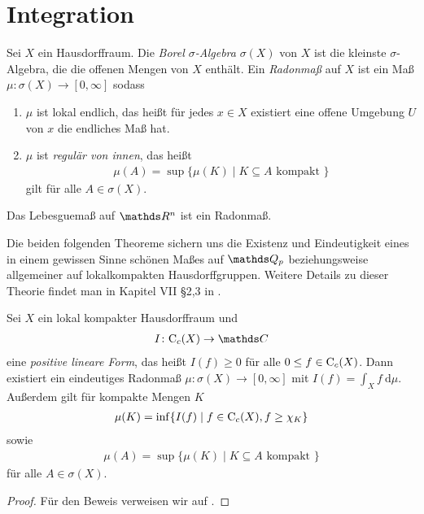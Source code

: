 \chapter{Integration}
\begin{defi}
Sei $X$ ein Hausdorffraum. Die \emph{Borel $\sigma$-Algebra} $\sigma(X)$ von $X$ ist die kleinste $\sigma$-Algebra, die die offenen Mengen von $X$ enthält.
Ein \emph{Radonmaß} auf $X$ ist ein Maß $\mu \colon \sigma(X) \to [0,\infty]$ sodass
\begin{enumerate}[label=\roman*)]
\item $\mu$ ist lokal endlich, das heißt für jedes $x\in X$ existiert eine offene Umgebung $U$ von $x$ die endliches Maß hat.
\item $\mu$ ist \emph{regulär von innen}, das heißt
\begin{align*}
\mu(A)=\sup\{\mu(K)\mid K\subseteq A \text{ kompakt }\}
\end{align*}
gilt für alle $A \in \sigma(X)$.
\end{enumerate}
\end{defi}

\begin{bsp}
Das Lebesguemaß auf $\Rn$ ist ein Radonmaß.
\end{bsp}

Die beiden folgenden Theoreme sichern uns die Existenz und Eindeutigkeit eines in einem gewissen Sinne schönen Maßes auf $\Q_p$ beziehungsweise allgemeiner auf lokalkompakten Hausdorffgruppen.
Weitere Details zu dieser Theorie findet man in Kapitel VII \S 2,3 in \cite{Elstrodt}.

\begin{thm}[Riesz]
Sei $X$ ein lokal kompakter Hausdorffraum und
\begin{align*}
I \colon \CC_c(X) \to \C
\end{align*}
eine \emph{positive lineare Form}, das heißt $I(f)\geq 0$ für alle $0\leq f \in \mathrm{C}_c(X)$.
Dann existiert ein eindeutiges Radonmaß $\mu \colon \sigma(X)\to [0,\infty]$ mit $I(f)=\int_X f ~\mathrm{d}\mu$.
Außerdem gilt für kompakte Mengen $K$
\begin{align*}
\mu(K)=\inf\{I(f)\mid f\in \mathrm{C}_c(X),f \geq \chi_K\}
\end{align*}
sowie
\begin{align*}
\mu(A)=\sup\{\mu(K)\mid K\subseteq A \text{ kompakt }\}
\end{align*}
für alle $A \in \sigma(X)$.
\end{thm}
\begin{proof}
Für den Beweis verweisen wir auf \cite[VII, 2.5]{Elstrodt}.
\end{proof}

